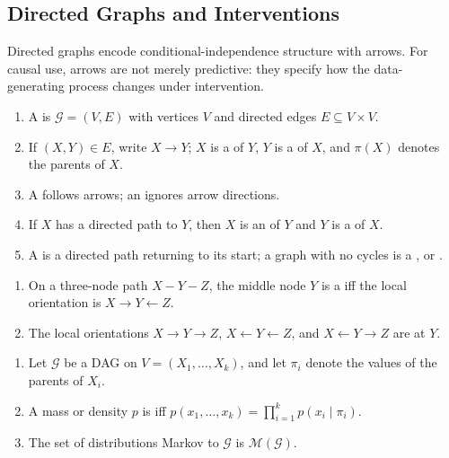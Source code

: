 \subsection{Directed Graphs and Interventions}

Directed graphs encode conditional-independence structure with arrows. For causal use, arrows are not merely predictive: they specify how the data-generating process changes under intervention.

\begin{definition} \label{def:directed-graph-dag-language} 
\begin{enumerate}[label=(\roman*)]
\setlength{\itemsep}{0pt}
\item A  is $\mathcal{G}=(V,E)$ with vertices $V$ and directed edges $E\subseteq V\times V$.
\item If $(X,Y)\in E$, write $X\to Y$; $X$ is a  of $Y$, $Y$ is a  of $X$, and $\pi(X)$ denotes the parents of $X$.
\item A  follows arrows; an  ignores arrow directions.
\item If $X$ has a directed path to $Y$, then $X$ is an  of $Y$ and $Y$ is a  of $X$.
\item A  is a directed path returning to its start; a graph with no cycles is a , or .
\end{enumerate}
\end{definition}

\begin{definition} \label{def:collider-and-noncollider} 
\begin{enumerate}[label=(\roman*)]
\setlength{\itemsep}{0pt}
\item On a three-node path $X-Y-Z$, the middle node $Y$ is a  iff the local orientation is $X\to Y\leftarrow Z$.
\item The local orientations $X\to Y\to Z$, $X\leftarrow Y\leftarrow Z$, and $X\leftarrow Y\to Z$ are  at $Y$.
\end{enumerate}
\end{definition}

\begin{definition} \label{def:dag-markov-factorization} 
\begin{enumerate}[label=(\roman*)]
\setlength{\itemsep}{0pt}
\item Let $\mathcal{G}$ be a DAG on $V=(X_1,\ldots,X_k)$, and let $\pi_i$ denote the values of the parents of $X_i$.
\item A mass or density $p$ is  iff $p(x_1,\ldots,x_k)=\prod_{i=1}^{k}p(x_i\mid\pi_i)$.
\item The set of distributions Markov to $\mathcal{G}$ is $\mathcal{M}(\mathcal{G})$.
\end{enumerate}
\end{definition}

